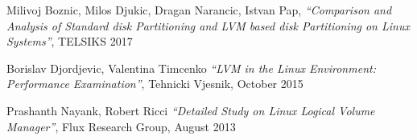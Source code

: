 \begin{thebibliography}{99}

    Milivoj Boznic, Milos Djukic, Dragan Narancic, Istvan Pap,
    \textit{``Comparison and Analysis of Standard disk Partitioning and LVM
    based disk Partitioning on Linux Systems''}, TELSIKS 2017

    Borislav Djordjevic, Valentina Timcenko
    \textit{``LVM in the Linux Environment: Performance Examination''},
    Tehnicki Vjesnik, October 2015

    Prashanth Nayank, Robert Ricci
    \textit{``Detailed Study on Linux Logical Volume Manager''},
    Flux Research Group, August 2013

\end{thebibliography}

